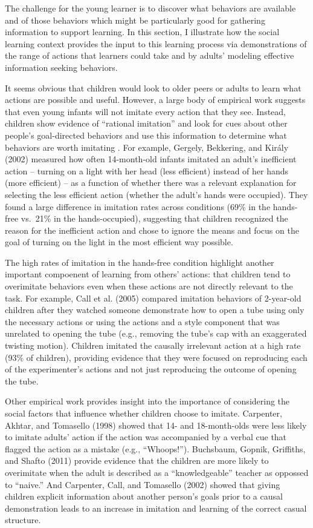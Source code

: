 \documentclass[english,floatsintext,man]{apa6}
\theoremstyle{definition}
\theoremstyle{definition}
\theoremstyle{definition}
\theoremstyle{remark}
\begin{document}
The challenge for the young learner is to discover what behaviors are
available and of those behaviors which might be particularly good for
gathering information to support learning. In this section, I illustrate
how the social learning context provides the input to this learning
process via demonstrations of the range of actions that learners could
take and by adults' modeling effective information seeking behaviors.

It seems obvious that children would look to older peers or adults to
learn what actions are possible and useful. However, a large body of
empirical work suggests that even young infants will not imitate every
action that they see. Instead, children show evidence of
\enquote{rational imitation} and look for cues about other people's
goal-directed behaviors and use this information to determine what
behaviors are worth imitating . For example, Gergely, Bekkering, and
Király (2002) measured how often 14-month-old infants imitated an
adult's inefficient action -- turning on a light with her head (less
efficient) instead of her hands (more efficient) -- as a function of
whether there was a relevant explanation for selecting the less
efficient action (whether the adult's hands were occupied). They found a
large difference in imitation rates across conditions (69\% in the
hands-free vs.~21\% in the hands-occupied), suggesting that children
recognized the reason for the inefficient action and chose to ignore the
means and focus on the goal of turning on the light in the most
efficient way possible.

The high rates of imitation in the hands-free condition highlight
another important compoenent of learning from others' actions: that
children tend to overimitate behaviors even when these actions are not
directly relevant to the task. For example, Call et al. (2005) compared
imitation behaviors of 2-year-old children after they watched someone
demonstrate how to open a tube using only the necessary actions or using
the actions and a style component that was unrelated to opening the tube
(e.g., removing the tube's cap with an exaggerated twisting motion).
Children imitated the causally irrelevant action at a high rate (93\% of
children), providing evidence that they were focused on reproducing each
of the experimenter's actions and not just reproducing the outcome of
opening the tube.

Other empirical work provides insight into the importance of considering
the social factors that influence whether children choose to imitate.
Carpenter, Akhtar, and Tomasello (1998) showed that 14- and
18-month-olds were less likely to imitate adults' action if the action
was accompanied by a verbal cue that flagged the action as a mistake
(e.g., \enquote{Whoops!}). Buchsbaum, Gopnik, Griffiths, and Shafto
(2011) provide evidence that the children are more likely to overimitate
when the adult is described as a \enquote{knowledgeable} teacher as
oppossed to \enquote{naive.} And Carpenter, Call, and Tomasello (2002)
showed that giving children explicit information about another person's
goals prior to a causal demonstration leads to an increase in imitation
and learning of the correct casual structure.
\end{document}
